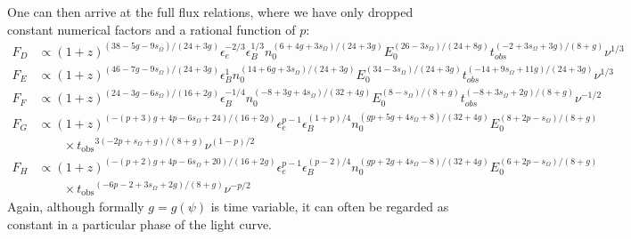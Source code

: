 \documentclass[twocolumn]{aastex62}
\newcommand{\tobs}{\ensuremath{t_{\mathrm{obs}}}}
\newcommand{\som}{\ensuremath{s_{\Omega}}}
\begin{document}
One can then arrive at the full flux relations, where we have only dropped constant numerical factors and a rational function of $p$:
\begin{align}
F_D & \propto  (1+z)^{(38-5g-9\som)/(24+3g)} \epsilon_e^{-2/3} \epsilon_B^{1/3} n_0^{(6+4g+3\som)/(24+3g)} E_0^{(26-3\som)/(24+8g)} t_{obs}^{(-2+3\som+3g)/(8+g)} \nu^{1/3}  \\
F_E & \propto  (1+z)^{(46-7g-9\som)/(24+3g)} \epsilon_B^{1} n_0^{(14+6g+3\som)/(24+3g)} E_0^{(34-3\som)/(24+3g)} t_{obs}^{(-14+9\som+11g)/(24+3g)} \nu^{1/3}  \\
F_F & \propto  (1+z)^{(24-3g-6\som)/(16+2g)} \epsilon_B^{-1/4} n_0^{(-8+3g+4\som)/(32+4g)} E_0^{(8-\som)/(8+g)} t_{obs}^{(-8+3\som+2g)/(8+g)} \nu^{-1/2}  \\
F_G & \propto  (1+z)^{(-(p+3)g+4p-6\som+24)/(16+2g)} \epsilon_e^{p-1} \epsilon_B^{(1+p)/4} n_0^{(gp + 5 g + 4\som + 8)/(32+4g)} E_0^{(8+2p-\som)/(8+g)} \nonumber \\
 	& \qquad \times \tobs^{3(-2p+\som+g)/(8+g)} \nu^{(1-p)/2}  \\
F_H & \propto  (1+z)^{(-(p+2)g+4p-6\som+20)/(16+2g)} \epsilon_e^{p-1} \epsilon_B^{(p-2)/4} n_0^{(gp+2g+4\som-8)/(32+4g)} E_0^{(6+2p-\som)/(8+g)} \nonumber \\
	&\qquad \times \tobs^{(-6p-2+3\som+2g)/(8+g)} \nu^{-p/2} 
\end{align}
Again, although formally $g = g(\psi)$ is time variable, it can often be regarded as constant in a particular phase of the light curve.
\end{document}
